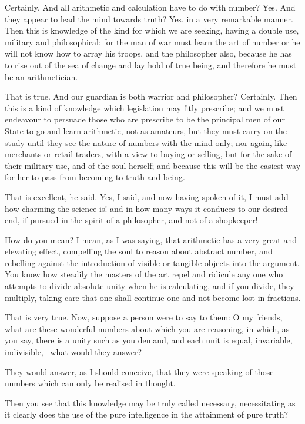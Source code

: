 Certainly.
And all arithmetic and calculation have to do with number?
Yes.
And they appear to lead the mind towards truth?
Yes, in a very remarkable manner.
Then this is knowledge of the kind for which we are seeking, having a double use, military and philosophical; for the man of war must learn the art of number or he will not know how to array his troops, and the philosopher also, because he has to rise out of the sea of change and lay hold of true being, and therefore he must be an arithmetician.

That is true.
And our guardian is both warrior and philosopher?
Certainly.
Then this is a kind of knowledge which legislation may fitly prescribe; and we must endeavour to persuade those who are prescribe to be the principal men of our State to go and learn arithmetic, not as amateurs, but they must carry on the study until they see the nature of numbers with the mind only; nor again, like merchants or retail-traders, with a view to buying or selling, but for the sake of their military use, and of the soul herself; and because this will be the easiest way for her to pass from becoming to truth and being.

That is excellent, he said.
Yes, I said, and now having spoken of it, I must add how charming the science is! and in how many ways it conduces to our desired end, if pursued in the spirit of a philosopher, and not of a shopkeeper!

How do you mean?
I mean, as I was saying, that arithmetic has a very great and elevating effect, compelling the soul to reason about abstract number, and rebelling against the introduction of visible or tangible objects into the argument. You know how steadily the masters of the art repel and ridicule any one who attempts to divide absolute unity when he is calculating, and if you divide, they multiply, taking care that one shall continue one and not become lost in fractions.

That is very true.
Now, suppose a person were to say to them: O my friends, what are these wonderful numbers about which you are reasoning, in which, as you say, there is a unity such as you demand, and each unit is equal, invariable, indivisible, --what would they answer?

They would answer, as I should conceive, that they were speaking of those numbers which can only be realised in thought.

Then you see that this knowledge may be truly called necessary, necessitating as it clearly does the use of the pure intelligence in the attainment of pure truth?

